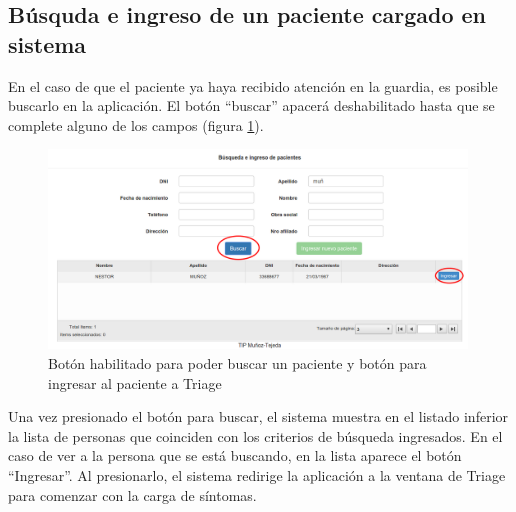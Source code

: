 \subsection{Búsquda e ingreso de un paciente cargado en sistema}
En el caso de que el paciente ya haya recibido atención en la guardia, es posible buscarlo en la aplicación. El botón ``buscar'' apacerá deshabilitado hasta que se complete alguno de los campos (figura \ref{fig:inicio_busqueda}).
\begin{figure}
\centerline{\includegraphics[width=0.99\textwidth]{inicio_busqueda.png}}
\caption{Botón habilitado para poder buscar un paciente y botón para ingresar al paciente a Triage} \label{fig:inicio_busqueda}
\end{figure}
Una vez presionado el botón para buscar, el sistema muestra en el listado inferior la lista de personas que coinciden con los criterios de búsqueda ingresados. En el caso de ver a la persona que se está buscando, en la lista aparece el botón ``Ingresar''. Al presionarlo, el sistema redirige la aplicación a la ventana de Triage para comenzar con la carga de síntomas.	

